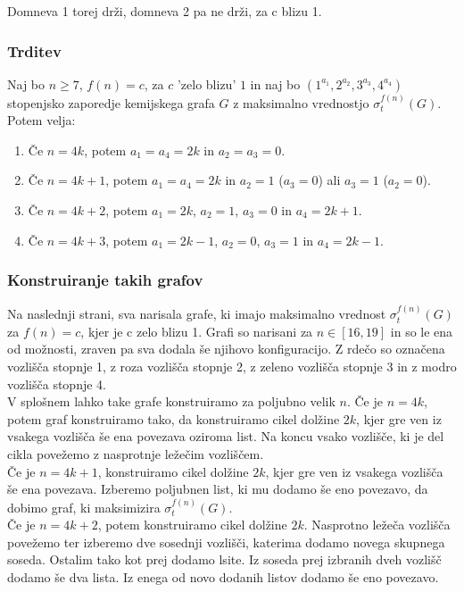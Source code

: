 \documentclass{article}
\begin{document}
Domneva 1 torej drži, domneva 2 pa ne drži, za c blizu 1.

\subsubsection*{Trditev}
Naj bo $n \geq 7$, $f(n) = c$, za $c$ 'zelo blizu' $1$ in naj bo $(1^{a_1}, 2^{a_2}, 3^{a_3}, 4^{a_4})$
stopenjsko zaporedje kemijskega grafa $G$ z maksimalno vrednostjo $\sigma_t^{f(n)}(G)$. Potem velja:
\begin{enumerate}
    \item Če $n = 4k$, potem $a_1 = a_4 = 2k$ in $a_2 = a_3 = 0$.
    \item Če $n = 4k + 1$, potem $a_1 = a_4 = 2k$ in $a_2 = 1$ ($a_3 = 0$) ali $a_3 = 1$ ($a_2 = 0$).
    \item Če $n = 4k + 2$, potem $a_1 = 2k$, $a_2 = 1$, $a_3 = 0$ in $a_4 = 2k + 1$.
    \item Če $n = 4k + 3$, potem $a_1 = 2k - 1$, $a_2 = 0$, $a_3 = 1$ in $a_4 = 2k - 1$.
\end{enumerate}

\subsubsection*{Konstruiranje takih grafov}
Na naslednji strani, sva narisala grafe, ki imajo maksimalno vrednost $\sigma_t^{f(n)}(G)$ za $f(n) = c$,
kjer je c zelo blizu 1. Grafi so narisani za $n \in [16, 19]$ in so le ena od možnosti, zraven
pa sva dodala še njihovo konfiguracijo. Z rdečo so označena vozlišča stopnje 1, z roza 
vozlišča stopnje 2, z zeleno vozlišča stopnje 3 in z modro vozlišča stopnje 4. \\

V splošnem lahko take grafe konstruiramo za poljubno velik $n$. Če je $n = 4k$, potem 
graf konstruiramo tako, da konstruiramo cikel dolžine $2k$, kjer gre ven iz vsakega vozlišča
še ena povezava oziroma list. Na koncu vsako vozlišče, ki je del cikla povežemo z nasprotnje ležečim
vozliščem. \\

Če je $n = 4k + 1$, konstruiramo cikel dolžine $2k$, kjer gre ven iz
vsakega vozlišča še ena povezava. Izberemo poljubnen list, ki mu dodamo še eno povezavo, da 
dobimo graf, ki maksimizira $\sigma_t^{f(n)}(G)$. \\

Če je $n = 4k + 2$, potem konstruiramo cikel dolžine $2k$. Nasprotno ležeča vozlišča povežemo ter
izberemo dve sosednji vozlišči, katerima dodamo novega skupnega soseda. Ostalim tako kot prej dodamo
lsite. Iz soseda prej izbranih dveh vozlišč dodamo še dva lista. Iz enega od novo dodanih listov
dodamo še eno povezavo.  \\
\end{document}
